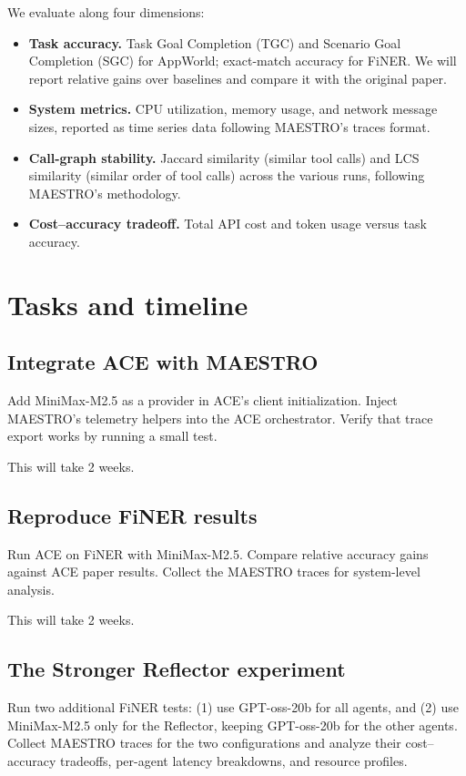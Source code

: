 \documentclass[letterpaper,twocolumn,10pt]{article}
\begin{document}
We evaluate along four dimensions:

\begin{itemize}
    \item \textbf{Task accuracy.} Task Goal Completion (TGC) and Scenario Goal Completion (SGC) for AppWorld; exact-match accuracy for FiNER. We will report relative gains over baselines and compare it with the original paper.
    \item \textbf{System metrics.} CPU utilization, memory usage, and network message sizes, reported as time series data following MAESTRO's traces format.
    \item \textbf{Call-graph stability.} Jaccard similarity (similar tool calls) and LCS similarity (similar order of tool calls) across the various runs, following MAESTRO's methodology.
    \item \textbf{Cost--accuracy tradeoff.} Total API cost and token usage versus task accuracy.
\end{itemize}

\section{Tasks and timeline}

\subsection{Integrate ACE with MAESTRO}
Add MiniMax-M2.5 as a provider in ACE's client initialization. Inject MAESTRO's telemetry helpers into the ACE orchestrator. Verify that trace export works by running a small test.

This will take 2 weeks.

\subsection{Reproduce FiNER results}
Run ACE on FiNER with MiniMax-M2.5. Compare relative accuracy gains against ACE paper results. Collect the MAESTRO traces for system-level analysis.

This will take 2 weeks.

\subsection{The Stronger Reflector experiment}
Run two additional FiNER tests: (1) use GPT-oss-20b for all agents, and (2) use MiniMax-M2.5 only for the Reflector, keeping GPT-oss-20b for the other agents. Collect MAESTRO traces for the two configurations and analyze their cost--accuracy tradeoffs, per-agent latency breakdowns, and resource profiles.
\end{document}
